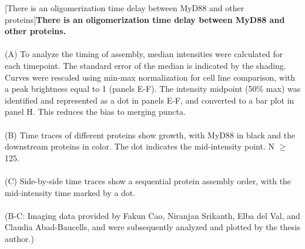 \begin{centering}
\captionsetup{parbox=none}
[There is an oligomerization time delay between MyD88 and other proteins]{\textbf{There is an oligomerization time delay between MyD88 and other proteins.}
\\
\\
(A) To analyze the timing of assembly, median intensities were calculated for each timepoint. The standard error of the median is indicated by the shading. Curves were rescaled using min-max normalization for cell line comparison, with a peak brightness equal to 1 (panels E-F). The intensity midpoint (50\% max) was identified and represented as a dot in panels E-F, and converted to a bar plot in panel H. This reduces the bias to merging puncta.
\\
\\
(B) Time traces of different proteins show growth, with MyD88 in black and the downstream proteins in color. The dot indicates the mid-intensity point. N $\geq$ 125.
\\
\\
(C) Side-by-side time traces show a sequential protein assembly order, with the mid-intensity time marked by a dot.
\\
\\
(B-C: Imaging data provided by Fakun Cao, Niranjan Srikanth, Elba del Val, and Claudia Abad-Baucells, and were subsequently analyzed and plotted by the thesis author.)}
\label{p2:1a}
\end{centering}

